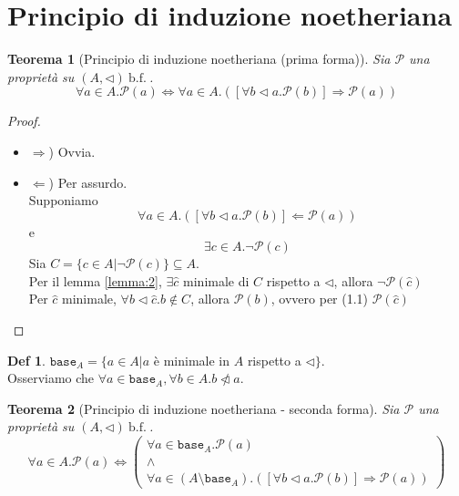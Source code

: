 \documentclass[a4paper]{report}
\newcommand{\bnfn}{\ \mathrm{b.f.}\ }
\newcommand{\prop}{\mathcal{P}}
\newcommand{\base}[1]{\mathtt{base}_{#1}}
\theoremstyle{definition} \newtheorem*{defi}{Def}
\theoremstyle{plain} \newtheorem{lemma}{Lemma}
\theoremstyle{plain} \newtheorem{teo}{Teorema}
\theoremstyle{remark} \newtheorem*{es}{Esempio}
\begin{document}
\section{Principio di induzione noetheriana}
\begin{teo}[Principio di induzione noetheriana (prima forma)]
  Sia $\prop$ una proprietà su $(A, \lhd) \bnfn$.\\
  \[
    \forall a \in A.\prop(a) \Leftrightarrow 
    \forall a \in A.([\forall b \lhd a . \prop(b)] 
    \Rightarrow \prop(a))
  \]
\end{teo}
\begin{proof}
  \begin{itemize}
    \item{$\Rightarrow$)} Ovvia.
    \item{$\Leftarrow$)} Per assurdo.\\
      Supponiamo
      \begin{equation}
        \forall a \in A.([\forall b \lhd a.\prop(b)]
        \Leftarrow \prop(a))
      \end{equation}
      e
      \begin{equation}
        \exists c \in A .\neg\prop(c)
      \end{equation}
      Sia $C=\{c \in A | \neg \prop(c)\} \subseteq A$.\\
      Per il lemma \ref{lemma:2}, $\exists \hat{c}$ minimale di $C$ rispetto a 
      $\lhd$, allora $\neg \prop(\hat{c})$\\
      Per $\hat{c}$ minimale, $\forall b \lhd \hat{c}.b \not\in C$, allora
      $\prop(b)$, ovvero per (1.1) $\prop(\hat{c})$
  \end{itemize}
\end{proof}

\begin{defi}
  $\base{A}=\{a \in A | a$ è minimale in $A$ rispetto a $\lhd \}$.\\
  Osserviamo che $\forall a \in \base{A}, \forall b \in A . b \ntriangleleft a$.
\end{defi}

\begin{teo}[Principio di induzione noetheriana - seconda forma]
  Sia $\prop$ una proprietà su $(A, \lhd) \bnfn$.\\
  \[
    \forall a \in A.\prop(a) \Leftrightarrow 
    \begin{pmatrix} 
      \forall a \in \base{A}.\prop(a)\\
      \wedge\\
      \forall a \in (A \setminus \base{A})
      .([\forall b \lhd a . \prop(b)] \Rightarrow \prop(a))
    \end{pmatrix}
  \]
\end{teo}
\end{document}
